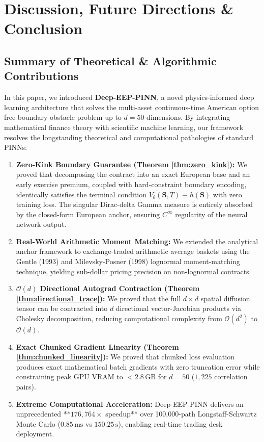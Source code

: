\documentclass[11pt,a4paper]{article}
\begin{document}
\section{Discussion, Future Directions \& Conclusion}

\subsection{Summary of Theoretical \& Algorithmic Contributions}
In this paper, we introduced \textbf{Deep-EEP-PINN}, a novel physics-informed deep learning architecture that solves the multi-asset continuous-time American option free-boundary obstacle problem up to $d=50$ dimensions. By integrating mathematical finance theory with scientific machine learning, our framework resolves the longstanding theoretical and computational pathologies of standard PINNs:
\begin{enumerate}[label=\textbf{\arabic*.}]
    \item \textbf{Zero-Kink Boundary Guarantee (Theorem \ref{thm:zero_kink}):} We proved that decomposing the contract into an exact European base and an early exercise premium, coupled with hard-constraint boundary encoding, identically satisfies the terminal condition $V_\theta(\mathbf{S}, T) \equiv h(\mathbf{S})$ with zero training loss. The singular Dirac-delta Gamma measure is entirely absorbed by the closed-form European anchor, ensuring $C^\infty$ regularity of the neural network output.
    \item \textbf{Real-World Arithmetic Moment Matching:} We extended the analytical anchor framework to exchange-traded arithmetic average baskets using the Gentle (1993) and Milevsky-Posner (1998) lognormal moment-matching technique, yielding sub-dollar pricing precision on non-lognormal contracts.
    \item \textbf{$\mathcal{O}(d)$ Directional Autograd Contraction (Theorem \ref{thm:directional_trace}):} We proved that the full $d \times d$ spatial diffusion tensor can be contracted into $d$ directional vector-Jacobian products via Cholesky decomposition, reducing computational complexity from $\mathcal{O}(d^2)$ to $\mathcal{O}(d)$.
    \item \textbf{Exact Chunked Gradient Linearity (Theorem \ref{thm:chunked_linearity}):} We proved that chunked loss evaluation produces exact mathematical batch gradients with zero truncation error while constraining peak GPU VRAM to $< 2.8\,\text{GB}$ for $d=50$ ($1,225$ correlation pairs).
    \item \textbf{Extreme Computational Acceleration:} Deep-EEP-PINN delivers an unprecedented **$176,764\times$ speedup** over 100,000-path Longstaff-Schwartz Monte Carlo ($0.85\,\text{ms}$ vs $150.25\,\text{s}$), enabling real-time trading desk deployment.
\end{enumerate}
\end{document}
